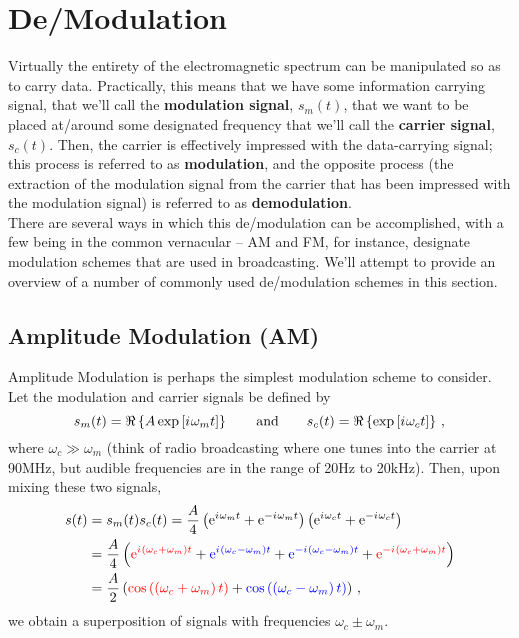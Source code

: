 \section{De/Modulation}
%
Virtually the entirety of the electromagnetic spectrum can be manipulated so as
to carry data. Practically, this means that we have some information carrying
signal, that we'll call the \textbf{modulation signal}, $s_m(t)$, that we want
to be placed at/around some designated frequency that we'll call the
\textbf{carrier signal}, $s_c(t)$. Then, the carrier is effectively impressed
with the data-carrying signal; this process is referred to as
\textbf{modulation}, and the opposite process (the extraction of the modulation
signal from the carrier that has been impressed with the modulation signal) is
referred to as \textbf{demodulation}.\\
%
There are several ways in which this de/modulation can be accomplished, with a
few being in the common vernacular -- AM and FM, for instance, designate
modulation schemes that are used in broadcasting. We'll attempt to provide an
overview of a number of commonly used de/modulation schemes in this section.

\subsection{Amplitude Modulation (AM)}
%
Amplitude Modulation is perhaps the simplest modulation scheme to consider.
Let the modulation and carrier signals be defined by
%
\begin{displaymath}
  s_m(t) = \Re\left\{ A \exp\left[ {i\mkern1mu}\omega_m t \right] \right\}
  \qquad\mathrm{and}\qquad
  s_c(t) = \Re\left\{ \exp\left[ {i\mkern1mu}\omega_c t \right] \right\} \,,
\end{displaymath}
%
where $\omega_c \gg \omega_m$ (think of radio broadcasting where one tunes into
the carrier at 90MHz, but audible frequencies are in the range of 20Hz to
20kHz). Then, upon mixing these two signals, 
%
\begin{align*}
  s(t) &= s_m(t) s_c(t)
  = \frac{A}{4}\left( \mathrm{e}^{{i\mkern1mu}\omega_m t} + \mathrm{e}^{-{i\mkern1mu}\omega_m t}\right)
  \left(\mathrm{e}^{{i\mkern1mu}\omega_c t} + \mathrm{e}^{-{i\mkern1mu}\omega_c t}\right) \\
  &= \frac{A}{4} \left(
    {\color{red}{\mathrm{e}^{{i\mkern1mu}\left(\omega_c + \omega_m\right) t}}} +
    {\color{blue}{\mathrm{e}^{{i\mkern1mu}\left(\omega_c - \omega_m\right) t}}} +
    {\color{blue}{\mathrm{e}^{-{i\mkern1mu}\left(\omega_c - \omega_m\right) t}}} +
    {\color{red}{\mathrm{e}^{-{i\mkern1mu}\left(\omega_c + \omega_m\right) t}}}
  \right)\\
  &= \frac{A}{2} \left(
    {\color{red}{\cos\left(\left(\omega_c + \omega_m\right) t\right)}} +
    {\color{blue}{\cos\left(\left(\omega_c - \omega_m\right) t\right)}}
  \right) \,,
\end{align*}
%
we obtain a superposition of signals with frequencies $\omega_c \pm
\omega_m$.\\

